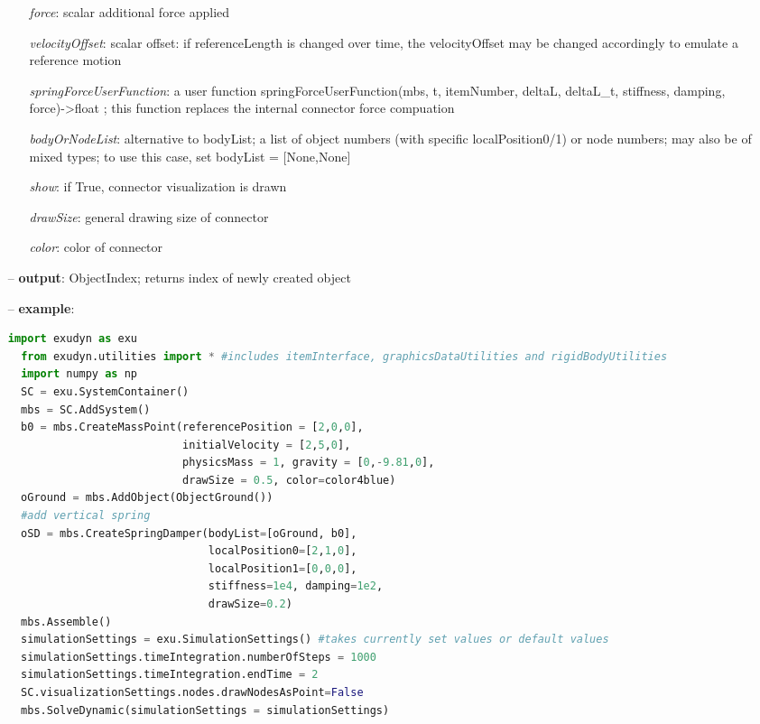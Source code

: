 \begin{itemize}[leftmargin=0.7cm]
\begin{itemize}[leftmargin=1.2cm]
\item[]{\it force}: scalar additional force applied
\item[]{\it velocityOffset}: scalar offset: if referenceLength is changed over time, the velocityOffset may be changed accordingly to emulate a reference motion
\item[]{\it springForceUserFunction}: a user function springForceUserFunction(mbs, t, itemNumber, deltaL, deltaL\_t, stiffness, damping, force)->float ; this function replaces the internal connector force compuation
\item[]{\it bodyOrNodeList}: alternative to bodyList; a list of object numbers (with specific localPosition0/1) or node numbers; may also be of mixed types; to use this case, set bodyList = [None,None]
\item[]{\it show}: if True, connector visualization is drawn
\item[]{\it drawSize}: general drawing size of connector
\item[]{\it color}: color of connector
\end{itemize}
\item[--]
{\bf output}: ObjectIndex; returns index of newly created object
\item[--]
{\bf example}: \vspace{-12pt}\ei\begin{lstlisting}[language=Python, xleftmargin=36pt]
  import exudyn as exu
  from exudyn.utilities import * #includes itemInterface, graphicsDataUtilities and rigidBodyUtilities
  import numpy as np
  SC = exu.SystemContainer()
  mbs = SC.AddSystem()
  b0 = mbs.CreateMassPoint(referencePosition = [2,0,0],
                           initialVelocity = [2,5,0],
                           physicsMass = 1, gravity = [0,-9.81,0],
                           drawSize = 0.5, color=color4blue)
  oGround = mbs.AddObject(ObjectGround())
  #add vertical spring
  oSD = mbs.CreateSpringDamper(bodyList=[oGround, b0],
                               localPosition0=[2,1,0],
                               localPosition1=[0,0,0],
                               stiffness=1e4, damping=1e2,
                               drawSize=0.2)
  mbs.Assemble()
  simulationSettings = exu.SimulationSettings() #takes currently set values or default values
  simulationSettings.timeIntegration.numberOfSteps = 1000
  simulationSettings.timeIntegration.endTime = 2
  SC.visualizationSettings.nodes.drawNodesAsPoint=False
  mbs.SolveDynamic(simulationSettings = simulationSettings)
\end{lstlisting}\vspace{-24pt}\bi\item[]\vspace{-24pt}\vspace{12pt}\end{itemize}
%


